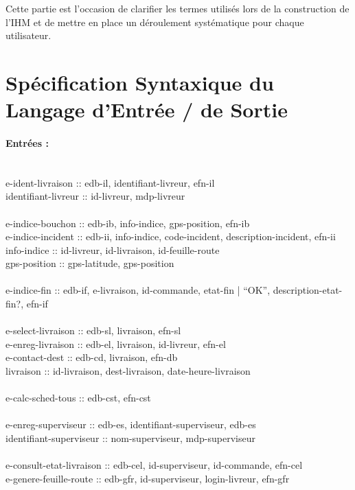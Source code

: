\documentclass{report}
\begin{document}
Cette partie est l'occasion de clarifier les termes utilisés lors de la construction de l'IHM et de mettre en place un déroulement systématique pour chaque utilisateur.\\


\section{Spécification Syntaxique du Langage d'Entrée / de Sortie}

\paragraph{Entrées :}
~~\\
e-ident-livraison :: edb-il, identifiant-livreur, efn-il\\
identifiant-livreur :: id-livreur, mdp-livreur\\
~~\\
e-indice-bouchon :: edb-ib, info-indice, gps-position, efn-ib\\
e-indice-incident :: edb-ii, info-indice, code-incident, description-incident, efn-ii\\
info-indice :: id-livreur, id-livraison, id-feuille-route\\
gps-position :: gps-latitude, gps-position\\
~~\\
e-indice-fin :: edb-if, e-livraison, id-commande, etat-fin | “OK”, description-etat-fin?, efn-if\\
~~\\
e-select-livraison :: edb-sl, livraison, efn-sl\\
e-enreg-livraison :: edb-el, livraison, id-livreur, efn-el\\
e-contact-dest :: edb-cd, livraison, efn-db\\
livraison :: id-livraison, dest-livraison, date-heure-livraison\\
~~\\
e-calc-sched-tous :: edb-cst, efn-cst\\
~~\\
e-enreg-superviseur :: edb-es, identifiant-superviseur, edb-es\\
identifiant-superviseur :: nom-superviseur, mdp-superviseur\\
~~\\
e-consult-etat-livraison :: edb-cel, id-superviseur, id-commande, efn-cel\\
e-genere-feuille-route :: edb-gfr, id-superviseur, login-livreur, efn-gfr\\
\end{document}
